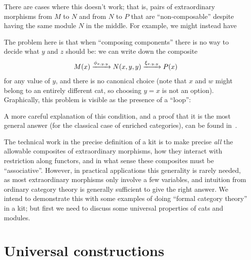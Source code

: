 \documentclass{amsart}
\let\mto\vdash    %
\def\mhom#1#2{\left( #1 \vphantom{\big|}\mto #2 \right)}
\begin{document}
There are cases where this doesn't work; that is, pairs of extraordinary morphisms from $M$ to $N$ and from $N$ to $P$ that are ``non-composable'' despite having the same module $N$ in the middle.
For example, we might instead have
The problem here is that when ``composing components'' there is no way to decide what $y$ and $z$ should be: we can write down the composite
\[ M(x) \xrightarrow{\phi_{x,y,y}} N(x,y,y) \xrightarrow{\xi_{x,y,y}} P(x) \]
for any value of $y$, and there is no canonical choice (note that $x$ and $w$ might belong to an entirely different cat, so choosing $y=x$ is not an option).
Graphically, this problem is visible as the presence of a ``loop'':
\begin{center}
\end{center}
A more careful explanation of this condition, and a proof that it is the most general answer (for the classical case of enriched categories), can be found in~\cite{ek:gen-funct-calc}.

The technical work in the precise definition of a kit is to make precise \emph{all} the allowable composites of extraordinary morphisms, how they interact with restriction along functors, and in what sense these composites must be ``associative''.
However, in practical applications this generality is rarely needed, as most extraordinary morphisms only involve a few variables, and intuition from ordinary category theory is generally sufficient to give the right answer.
We intend to demonstrate this with some examples of doing ``formal category theory'' in a kit; but first we need to discuss some universal properties of cats and modules.

\section{Universal constructions}
\label{sec:univ}
\end{document}
